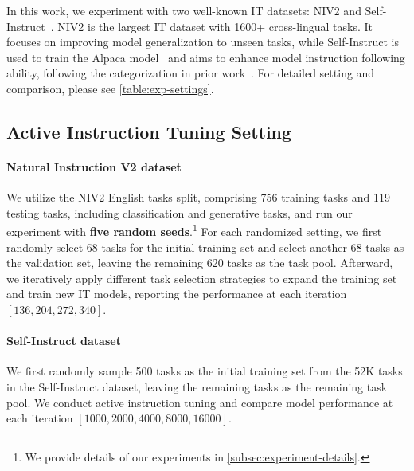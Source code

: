 In this work, we experiment with two well-known IT datasets: NIV2 and Self-Instruct~\cite{Wang2022SuperNaturalInstructionsGV, wang2022self}. NIV2 is the largest IT dataset with 1600+ cross-lingual tasks. It focuses on improving model generalization to unseen tasks, while Self-Instruct is used to train the Alpaca model~\cite{alpaca} and aims to enhance model instruction following ability, following the categorization in prior work~\cite{kung2023models}. For detailed setting and comparison, please see \autoref{table:exp-settings}.


\subsection{Active Instruction Tuning Setting}
\paragraph{Natural Instruction V2 dataset}
We utilize the NIV2 English tasks split, comprising 756 training tasks and 119 testing tasks, including classification and generative tasks, and run our experiment with \textbf{five random seeds}.\footnote{We provide details of our experiments in \autoref{subsec:experiment-details}.}
For each randomized setting, we first randomly select 68 tasks for the initial training set and select another 68 tasks as the validation set, leaving the remaining 620 tasks as the task pool. Afterward, we iteratively apply different task selection strategies to expand the training set and train new IT models, reporting the performance at each iteration $[136, 204, 272, 340]$.
\paragraph{Self-Instruct dataset}
We first randomly sample 500 tasks as the initial training set from the 52K tasks in the Self-Instruct dataset, leaving the remaining tasks as the remaining task pool. We conduct active instruction tuning and compare model performance at each iteration $[1000, 2000, 4000, 8000, 16000]$.
